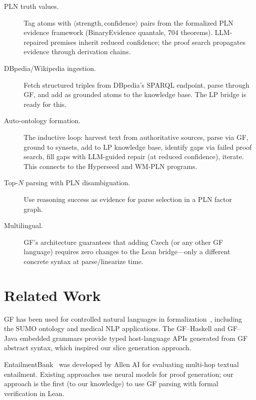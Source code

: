 \documentclass[]{article}
\begin{document}
\begin{description}
\item[PLN truth values.] Tag atoms with $\langle\text{strength},
  \text{confidence}\rangle$ pairs from the formalized PLN evidence
  framework (BinaryEvidence quantale, 704 theorems).  LLM-repaired
  premises inherit reduced confidence; the proof search propagates
  evidence through derivation chains.

\item[DBpedia/Wikipedia ingestion.] Fetch structured triples from
  DBpedia's SPARQL endpoint, parse through GF, and add as grounded
  atoms to the knowledge base.  The LP bridge is ready for this.

\item[Auto-ontology formation.] The inductive loop: harvest text
  from authoritative sources, parse via GF, ground to synsets, add
  to LP knowledge base, identify gaps via failed proof search, fill
  gaps with LLM-guided repair (at reduced confidence), iterate.
  This connects to the Hyperseed and WM-PLN programs.

\item[Top-$N$ parsing with PLN disambiguation.] Use reasoning success
  as evidence for parse selection in a PLN factor graph.

\item[Multilingual.] GF's architecture guarantees that adding
  Czech (or any other GF language) requires zero changes to the
  Lean bridge---only a different concrete syntax at parse/linearize
  time.
\end{description}

\section{Related Work}
\label{sec:related}

GF has been used for controlled natural languages in
formalization~\cite{ranta2011gf}, including the SUMO ontology
and medical NLP applications. The GF--Haskell and GF--Java
embedded grammars provide typed host-language APIs generated from
GF abstract syntax, which inspired our slice generation approach.

EntailmentBank~\cite{dalvi2021entailmentbank} was developed by
Allen AI for evaluating multi-hop textual entailment. Existing
approaches use neural models for proof generation; our approach
is the first (to our knowledge) to use GF parsing with formal
verification in Lean.

\end{document}
